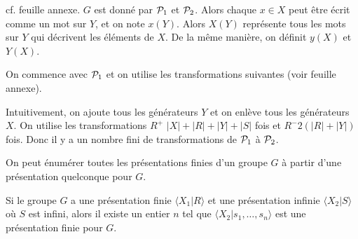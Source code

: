    \begin{preuve}
     cf. feuille annexe. $G$ est donné par ${\cal P}_1$ et ${\cal P}_2$. Alors chaque $x \in X$ peut être
     écrit comme un mot sur $Y$, et on note $x(Y)$. Alors $X(Y)$ représente tous les mots sur $Y$ qui
     décrivent les éléments de $X$. De la même manière, on définit $y(X)$ et $Y(X)$. 

     On commence avec ${\cal P}_1$ et on utilise les transformations suivantes (voir feuille annexe).

     Intuitivement, on ajoute tous les générateurs $Y$ et on enlève tous les générateurs $X$. On utilise les
     transformations $R^+$ $|X|+|R|+|Y|+|S|$ fois et $R^- 2(|R|+|Y|)$ fois. Donc il y a un nombre fini de transformations de ${\cal
       P}_1$ à ${\cal P}_2$.
   \end{preuve}

   \begin{cor}
     On peut énumérer toutes les présentations finies d'un groupe $G$ à partir d'une présentation quelconque
     pour $G$.
   \end{cor}

   \begin{prop}
     Si le groupe $G$ a une présentation finie $\langle X_1 |R \rangle$ et une présentation infinie $\langle
     X_2 | S \rangle$ où $S$ est infini, alors il existe un entier $n$ tel que $\langle X_2 | s_1, \ldots, s_n
     \rangle$ est une présentation finie pour $G$.
   \end{prop}




